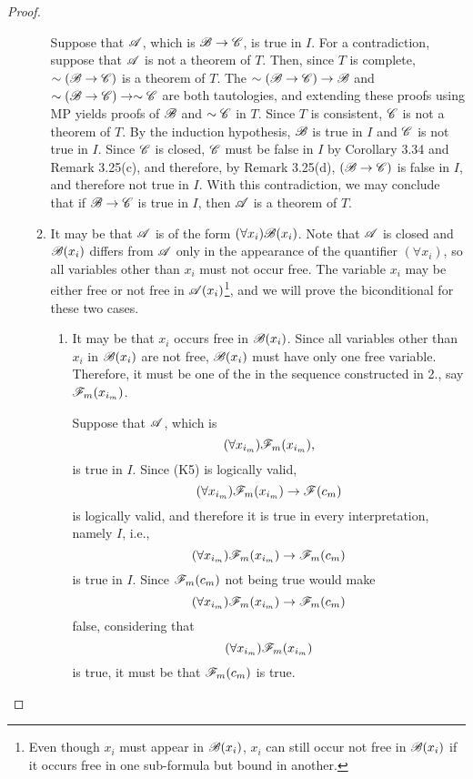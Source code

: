 \begin{proposition}
\begin{proof}
\begin{enumerate}
\begin{enumerate}
              \La{} Suppose that \(\mathscr{A}\), which is \(\mathscr{B} \rightarrow \mathscr{C}\), is true in \(I\). For a contradiction, suppose that \(\mathscr{A}\) is not a theorem of \(T\). Then, since \(T\) is complete, \(\sim(\mathscr{B} \rightarrow \mathscr{C})\) is a theorem of \(T\). The \wfs{} \(\sim(\mathscr{B} \rightarrow \mathscr{C}) \rightarrow \mathscr{B}\) and \(\sim(\mathscr{B} \rightarrow \mathscr{C}) \rightarrow \sim\mathscr{C}\) are both tautologies, and extending these proofs using MP yields proofs of \(\mathscr{B}\) and \(\sim\mathscr{C}\) in \(T\). Since \(T\) is consistent, \(\mathscr{C}\) is not a theorem of \(T\). By the induction hypothesis, \(\mathscr{B}\) is true in \(I\) and \(\mathscr{C}\) is not true in \(I\). Since \(\mathscr{C}\) is closed, \(\mathscr{C}\) must be false in \(I\) by Corollary 3.34 and Remark 3.25(c), and therefore, by Remark 3.25(d), \((\mathscr{B} \rightarrow \mathscr{C})\) is false in \(I\), and therefore not true in \(I\). With this contradiction, we may conclude that if \(\mathscr{B} \rightarrow \mathscr{C}\) is true in \(I\), then \(\mathscr{A}\) is a theorem of \(T\).

            \item It may be that \(\mathscr{A}\) is of the form \((\forall x_i)\mathscr{B}(x_i)\). Note that \(\mathscr{A}\) is closed and \(\mathscr{B}(x_i)\) differs from \(\mathscr{A}\) only in the appearance of the quantifier \((\forall x_i)\), so all variables other than \(x_i\) must not occur free. The variable \(x_i\) may be either free or not free in \(\mathscr{A}(x_i)\)\footnote{Even though \(x_i\) must appear in \(\mathscr{B}(x_i)\), \(x_i\) can still occur not free in \(\mathscr{B}(x_i)\) if it occurs free in one sub-formula but bound in another.}, and we will prove the biconditional for these two cases.
              \begin{enumerate}
                \item It may be that \(x_i\) occurs free in \(\mathscr{B}(x_i)\). Since all variables other than \(x_i\) in \(\mathscr{B}(x_i)\) are not free, \(\mathscr{B}(x_i)\) must have only one free variable. Therefore, it must be one of the \wfs{} in the sequence constructed in 2., say \(\mathscr{F}_m(x_{i_m})\).

                  \Ra{} Suppose that \(\mathscr{A}\), which is 
                  \[(\forall x_{i_m})\mathscr{F}_m(x_{i_m}),\]
                  is true in \(I\). Since (K5) is logically valid,
                  \[(\forall x_{i_m})\mathscr{F}_m(x_{i_m}) \rightarrow \mathscr{F}(c_m)\]
                  is logically valid, and therefore it is true in every interpretation, namely \(I\), i.e.,
                  \[(\forall x_{i_m})\mathscr{F}_m(x_{i_m}) \rightarrow \mathscr{F}_m(c_m)\]
                  is true in \(I\). Since \(\mathscr{F}_m(c_m)\) not being true would make
                  \[(\forall x_{i_m})\mathscr{F}_m(x_{i_m}) \rightarrow \mathscr{F}_m(c_m)\]
                  false, considering that
                  \[(\forall x_{i_m})\mathscr{F}_m(x_{i_m})\]
                  is true, it must be that \(\mathscr{F}_m(c_m)\) is true.


\end{enumerate}
\end{enumerate}
\end{enumerate}
\end{proof}
\end{proposition}
